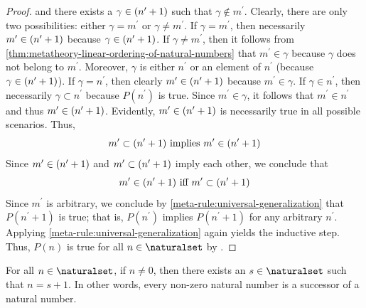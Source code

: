 \begin{proof}
    and there exists a \( \gamma \in \mleft( n^{\prime} + 1 \mright) \) such that \( \gamma \notin m^{\prime} \).
    Clearly, there are only two possibilities: either \( \gamma = m^{\prime} \) or \( \gamma \neq m^{\prime} \).
    If \( \gamma = m^{\prime} \), then necessarily \( m^{\prime} \in \mleft( n^{\prime} + 1 \mright) \) because \( \gamma \in \mleft( n^{\prime} + 1 \mright) \).
    If \( \gamma \neq m^{\prime} \), then it follows from \cref{thm:metatheory-linear-ordering-of-natural-numbers} that \( m^{\prime} \in \gamma \)
    because \( \gamma \) does not belong to \( m^{\prime} \).
    Moreover, \( \gamma \) is either \( n^{\prime} \) or an element of \( n^{\prime} \) (because \( \gamma \in \mleft( n^{\prime} + 1 \mright) \)).
    If \( \gamma = n^{\prime} \), then clearly \( m^{\prime} \in \mleft( n^{\prime} + 1 \mright) \) because \( m^{\prime} \in \gamma \).
    If \( \gamma \in n^{\prime} \), then necessarily \( \gamma \subset n^{\prime} \) because \( P(n^{\prime}) \) is true.
    Since \( m^{\prime} \in \gamma \), it follows that \( m^{\prime} \in n^{\prime} \) and thus \( m^{\prime} \in \mleft( n^{\prime} + 1 \mright) \).
    Evidently, \( m^{\prime} \in \mleft( n^{\prime} + 1 \mright) \) is necessarily true in all possible scenarios.
    Thus,
    \begin{equation*}
        m^{\prime} \subset \mleft( n^{\prime} + 1 \mright) \ \text{implies} \ m^{\prime} \in \mleft( n^{\prime} + 1 \mright)
    \end{equation*}
    Since \( m^{\prime} \in \mleft( n^{\prime} + 1 \mright) \) and \( m^{\prime} \subset \mleft( n^{\prime} + 1 \mright) \) imply each other, we conclude that
    \begin{equation*}
        m^{\prime} \in \mleft( n^{\prime} + 1 \mright) \ \text{iff} \ m^{\prime} \subset \mleft( n^{\prime} + 1 \mright)
    \end{equation*}
    Since \( m^{\prime} \) is arbitrary, we conclude by \cref{meta-rule:universal-generalization} that \( P(n^{\prime} + 1) \) is true;
    that is, \( P(n^{\prime}) \) implies \( P(n^{\prime} + 1) \) for any arbitrary \( n^{\prime} \).
    Applying \cref{meta-rule:universal-generalization} again yields the inductive step.
    Thus, \( P(n) \) is true for all \( n \in \naturalset \) by .
\end{proof}



\begin{thm}
     \label{thm:metatheory-every-nonzero-natural-number-is-a-successor-of-another-natural-number}
    For all \( n \in \naturalset \), if \( n \neq 0 \), then there exists an \( s \in \naturalset \) such that \( n = s + 1 \).
    In other words, every non-zero natural number is a successor of a natural number.
\end{thm}

